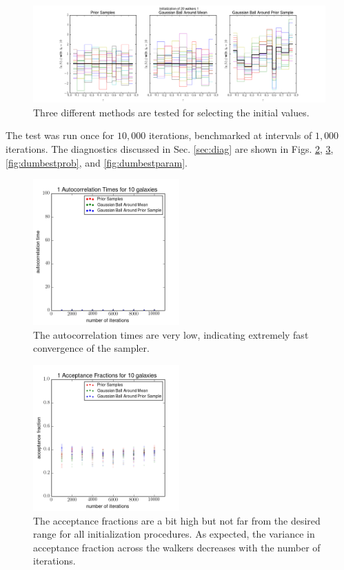 \documentclass[preprint]{aastex}
\begin{document}
\begin{figure}
\includegraphics[width=\textwidth]{toy/initializations.png}
\caption{Three different methods are tested for selecting the initial values.}
\label{fig:fakeival}
\end{figure}

The test was run once for $10,000$ iterations, benchmarked at intervals of $1,000$ iterations.  The diagnostics discussed in Sec. \ref{sec:diag} are shown in Figs. \ref{fig:dumbestacor}, \ref{fig:dumbestfrac}, \ref{fig:dumbestprob}, and \ref{fig:dumbestparam}.

\begin{figure}
\includegraphics[width=0.5\textwidth]{toy/times.png}
\caption{The autocorrelation times are very low, indicating extremely fast convergence of the sampler.}
\label{fig:dumbestacor}
\end{figure}

\begin{figure}
\includegraphics[width=0.5\textwidth]{toy/fracs.png}
\caption{The acceptance fractions are a bit high but not far from the desired range for all initialization procedures.  As expected, the variance in acceptance fraction across the walkers decreases with the number of iterations.}
\label{fig:dumbestfrac}
\end{figure}
\end{document}
